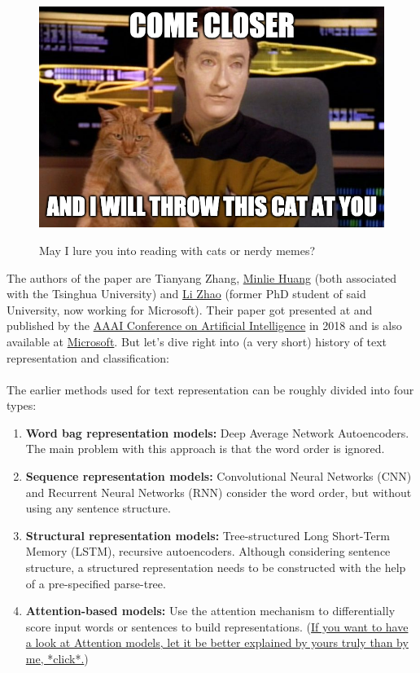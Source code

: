 \documentclass{article}
\begin{document}
\begin{figure}[!h]
    \centering
\includegraphics[scale=.35]{catthrow.png}
    \label{fig:my_label}
    \caption{May I lure you into reading with cats or nerdy memes?}
\end{figure}
\newpage

The authors of the paper are Tianyang Zhang, \href{http://coai.cs.tsinghua.edu.cn/hml/}{Minlie Huang} (both associated with the Tsinghua University) and \href{https://www.microsoft.com/en-us/research/people/lizo/}{Li Zhao} (former PhD student of said University, now working for Microsoft). Their paper got presented at and published by the \href{https://www.aaai.org/ocs/index.php/AAAI/AAAI18/paper/view/16537/16174}{AAAI Conference on Artificial Intelligence} in 2018 and is also available at \href{https://www.microsoft.com/en-us/research/wp-content/uploads/2017/11/zhang.pdf}{Microsoft}. But let's dive right into (a very short) history of text representation and classification:\\\\
The earlier methods used for text representation can be roughly divided into four types: \par
\begin{enumerate}
    \item \textbf{Word bag representation models:}  Deep Average Network Autoencoders. The main problem with this approach is that the word order is ignored.
    \item \textbf{Sequence representation models:} Convolutional Neural Networks (CNN) and Recurrent Neural Networks (RNN) consider the word order, but without using any sentence structure.
    \item \textbf{Structural representation models:} Tree-structured Long Short-Term Memory (LSTM), recursive autoencoders. Although considering sentence structure, a structured representation needs to be constructed with the help of a pre-specified parse-tree.
    \item \textbf{Attention-based models:} Use the attention mechanism to differentially score input words or sentences to build representations. (\href{https://www.youtube.com/watch?v=SysgYptB198}{If you want to have a look at Attention models, let it be better explained by yours truly than by me, *click*.})
\end{enumerate}
\end{document}
